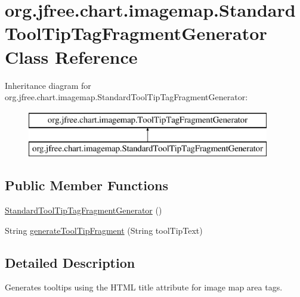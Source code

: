 \hypertarget{classorg_1_1jfree_1_1chart_1_1imagemap_1_1_standard_tool_tip_tag_fragment_generator}{}\section{org.\+jfree.\+chart.\+imagemap.\+Standard\+Tool\+Tip\+Tag\+Fragment\+Generator Class Reference}
\label{classorg_1_1jfree_1_1chart_1_1imagemap_1_1_standard_tool_tip_tag_fragment_generator}
Inheritance diagram for org.\+jfree.\+chart.\+imagemap.\+Standard\+Tool\+Tip\+Tag\+Fragment\+Generator\+:\begin{figure}[H]
\begin{center}
\leavevmode
\includegraphics[height=2.000000cm]{classorg_1_1jfree_1_1chart_1_1imagemap_1_1_standard_tool_tip_tag_fragment_generator}
\end{center}
\end{figure}
\subsection*{Public Member Functions}
\begin{DoxyCompactItemize}
\item 
\mbox{\hyperlink{classorg_1_1jfree_1_1chart_1_1imagemap_1_1_standard_tool_tip_tag_fragment_generator_aa7ba0114b6fdf41f6ae80bc98b97f934}{Standard\+Tool\+Tip\+Tag\+Fragment\+Generator}} ()
\item 
String \mbox{\hyperlink{classorg_1_1jfree_1_1chart_1_1imagemap_1_1_standard_tool_tip_tag_fragment_generator_a40fb616f58a4849953a399a320333f40}{generate\+Tool\+Tip\+Fragment}} (String tool\+Tip\+Text)
\end{DoxyCompactItemize}


\subsection{Detailed Description}
Generates tooltips using the H\+T\+ML title attribute for image map area tags. 

